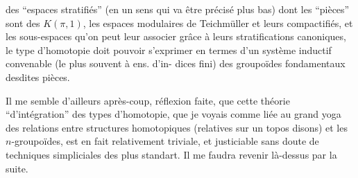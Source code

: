 des ``espaces stratifiés'' (en un sens qui
va être précisé plus bas) dont les
``pièces'' sont des $K(\pi,1)$, 
les espaces modulaires de Teichmüller
et leurs compactifiés, et les sous-espaces
qu'on peut leur associer grâce à leurs
stratifications canoniques, le type
d'homotopie doit pouvoir s'exprimer
en termes d'un système inductif
convenable (le plus souvent à ens. d'in-
dices fini) des groupoïdes fondamentaux
desdites pièces.

Il me semble d'ailleurs après-coup,
réflexion faite, que cette théorie ``d'intégration''
des types d'homotopie, que 
je voyais comme liée au grand yoga des
relations entre structures homotopiques (relatives
sur un topos disons) et les $n$-groupoïdes,
est en fait relativement triviale, et
justiciable sans doute de techniques 
simpliciales des plus standart. Il me
faudra revenir là-dessus par la suite.
